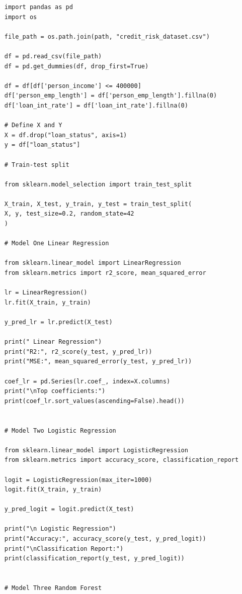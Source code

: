 \documentclass[letterpaper]{article}
\begin{document}
\begin{lstlisting}
     import pandas as pd
     import os
     
     file_path = os.path.join(path, "credit_risk_dataset.csv")
     
     df = pd.read_csv(file_path)
     df = pd.get_dummies(df, drop_first=True)
     
     df = df[df['person_income'] <= 400000]
     df['person_emp_length'] = df['person_emp_length'].fillna(0)
     df['loan_int_rate'] = df['loan_int_rate'].fillna(0)
     
     # Define X and Y
     X = df.drop("loan_status", axis=1)
     y = df["loan_status"]
     
     # Train-test split
     
     from sklearn.model_selection import train_test_split
     
     X_train, X_test, y_train, y_test = train_test_split(
     X, y, test_size=0.2, random_state=42
     )
     
     # Model One Linear Regression
     
     from sklearn.linear_model import LinearRegression
     from sklearn.metrics import r2_score, mean_squared_error
     
     lr = LinearRegression()
     lr.fit(X_train, y_train)
     
     y_pred_lr = lr.predict(X_test)
     
     print(" Linear Regression")
     print("R2:", r2_score(y_test, y_pred_lr))
     print("MSE:", mean_squared_error(y_test, y_pred_lr))
     
     coef_lr = pd.Series(lr.coef_, index=X.columns)
     print("\nTop coefficients:")
     print(coef_lr.sort_values(ascending=False).head())
     
     
     # Model Two Logistic Regression
     
     from sklearn.linear_model import LogisticRegression
     from sklearn.metrics import accuracy_score, classification_report
     
     logit = LogisticRegression(max_iter=1000)
     logit.fit(X_train, y_train)
     
     y_pred_logit = logit.predict(X_test)
     
     print("\n Logistic Regression")
     print("Accuracy:", accuracy_score(y_test, y_pred_logit))
     print("\nClassification Report:")
     print(classification_report(y_test, y_pred_logit))
     
     
     # Model Three Random Forest
     

\end{lstlisting}
\end{document}
